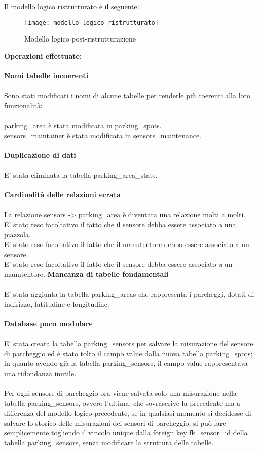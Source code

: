 Il modello logico ristrutturato è il seguente:
\begin{figure}[H]
  \centering
  \texttt{[image: modello-logico-ristrutturato]}
  \caption{Modello logico post-ristrutturazione}
\end{figure}
\leavevmode\newline
\textbf{Operazioni effettuate:}
\\\\
\textbf{Nomi tabelle incoerenti}
\\\\
Sono stati modificati i nomi di alcune tabelle per renderle più coerenti alla loro funzionalità:
\\\\
parking\_area è stata modificata in parking\_spots.
\\
sensors\_maintainer è stata modificata in sensors\_maintenance.
\\\\
\textbf{Duplicazione di dati}
\\\\
E' stata eliminata la tabella parking\_area\_stats.
\\\\
\textbf{Cardinalità delle relazioni errata}
\\\\
La relazione sensors -> parking\_area è diventata una relazione molti a molti.
\\
E' stato reso facoltativo il fatto che il sensore debba essere associato a una piazzola.
\\
E' stato reso facoltativo il fatto che il manutentore debba essere associato a un sensore.
\\
E' stato reso facoltativo il fatto che il sensore debba essere associato a un manutentore.
\clearpage
\leavevmode\newline
\textbf{Mancanza di tabelle fondamentali}
\\\\
E' stata aggiunta la tabella parking\_areas che rappresenta i parcheggi, dotati di indirizzo, latitudine e 
longitudine.
\\\\
\textbf{Database poco modulare}
\\\\
E' stata creata la tabella parking\_sensors per salvare la misurazione del sensore di parcheggio ed è
stato tolto il campo value dalla nuova tabella parking\_spots; in quanto avendo già la tabella parking\_sensors,
il campo value rappresentava una ridondanza inutile.
\\\\
Per ogni sensore di parcheggio ora viene salvata solo una misurazione nella tabella parking\_sensors, ovvero
l'ultima, che sovrascrive la precedente ma a differenza del modello logico precedente, se in qualsiasi momento
si decidesse di salvare lo storico delle misurazioni dei sensori di parcheggio, si può fare semplicemente togliendo
il vincolo unique dalla foreign key fk\_sensor\_id della tabella parking\_sensors, senza modificare la struttura delle tabelle.
